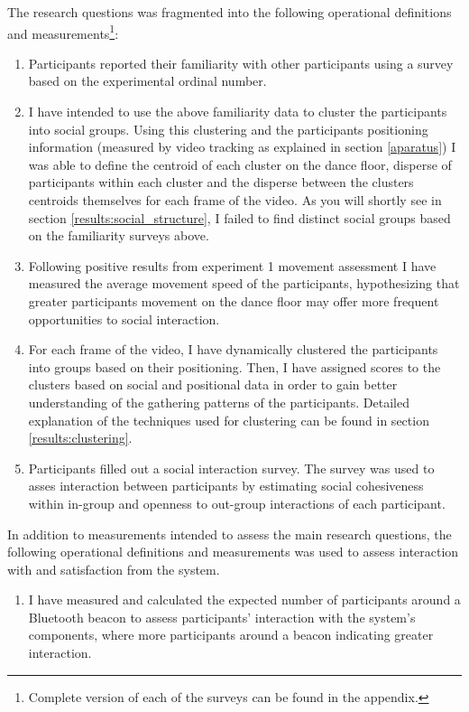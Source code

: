 \documentclass[a4paper,11pt]{article}
\begin{document}
{The research questions was fragmented into the following operational definitions and measurements\footnote{Complete version of each of the surveys can be found in the appendix.}:
\begin{enumerate}
	\item \label{measure:survey:familiarity} Participants reported their familiarity with other participants using a survey based on the experimental ordinal number.
	\item I have intended to use the above familiarity data to cluster the participants into social groups.
            Using this clustering and the participants positioning information (measured by video tracking as explained in section \ref{aparatus}) I was able to define the centroid of each cluster on the dance floor, disperse of participants within each cluster and the disperse between the clusters centroids themselves for each frame of the video.
            As you will shortly see in section \ref{results:social_structure}, I failed to find distinct social groups based on the familiarity surveys above.
        \item \label{measure:movement} Following positive results from experiment 1 movement assessment I have measured the average movement speed of the participants, hypothesizing that greater participants movement on the dance floor may offer more frequent opportunities to social interaction.
        \item \label{measure:clustering} For each frame of the video, I have dynamically clustered the participants into groups based on their positioning.
            Then, I have assigned scores to the clusters based on social and positional data in order to gain better understanding of the gathering patterns of the participants.
            Detailed explanation of the techniques used for clustering can be found in section \ref{results:clustering}. 
	\item \label{measure:survey:social} Participants filled out a social interaction survey.
	The survey was used to asses interaction between participants by estimating social cohesiveness within in-group and openness to out-group interactions of each participant.
\end{enumerate}
In addition to measurements intended to assess the main research questions, the following operational definitions and measurements was used to assess interaction with and satisfaction from the system.
\begin{enumerate}[resume]
	\item \label{measure:system} I have measured and calculated the expected number of participants around a Bluetooth beacon to assess participants' interaction with the system's components, where more participants around a beacon indicating greater interaction.

\end{enumerate}}
\end{document}
